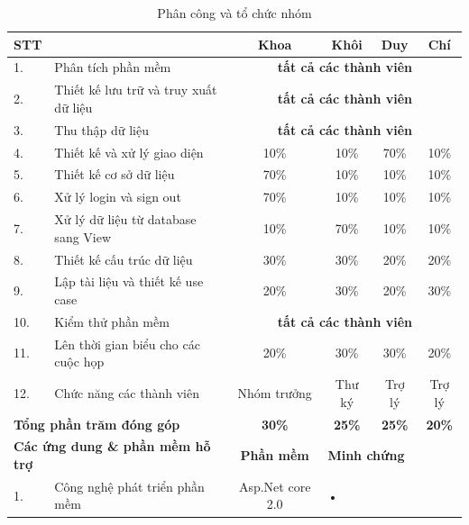\documentclass[a4paper]{article}
\begin{document}
	\begin{table}[h!]
	\centering
	\caption{Phân công và tổ chức nhóm}
	\label{tb:rubrics}
	\begin{tabularx}{475pt}{|l|X|c|c|c|c|}
		\hline\hline
		\textbf{STT} & \backslashbox{\textbf{Công việc}}{\textbf{Thành viên}} & \textbf{ Khoa} & \textbf{ Khôi} & \textbf{ Duy} & \textbf{ Chí}\\
		\hline
		1. & Phân tích phần mềm & \multicolumn{4}{|c|}{\textbf{tất cả các thành viên}}  \\ \hline
		2. & Thiết kế  lưu trữ và truy xuất dữ liệu   & \multicolumn{4}{|c|}{\textbf{tất cả các thành viên}} \\ \hline

		3. & Thu thập dữ liệu  & \multicolumn{4}{|c|}{\textbf{tất cả các thành viên}}  \\ \hline

		4. & Thiết kế và xử lý giao diện  & 10\% & 10\% & 70\% & 10\% \\ \hline

		5. & Thiết kế cơ sở dữ liệu & 70\% & 10\% & 10\% & 10\% \\ \hline
		6. & Xử lý login và sign out & 70\% & 10\% & 10\% & 10\% \\ \hline

		7. & Xử lý dữ liệu từ database sang View & 10\% & 70\% & 10\% & 10\% \\ \hline

		8. & Thiết kế cấu trúc dữ liệu & 30\% & 30\% & 20\% & 20\% \\ \hline

		9. & Lập tài liệu và thiết kế use case & 20\% & 30\% & 20\% & 30\% \\ \hline

		10. & Kiểm thử phần mềm & \multicolumn{4}{|c|}{\textbf{tất cả các thành viên}}  \\ \hline

		11. & Lên thời gian biểu cho các cuộc họp & 20\% & 30\% & 30\% & 20\% \\ \hline

		12. & Chức năng các thành viên & Nhóm trưởng & Thư ký & Trợ lý & Trợ lý \\ \hline


		\multicolumn{2}{|l|}{\textbf{Tổng phần trăm đóng góp}} &\textbf{30\%}& \textbf{25\%}& \textbf{25\%} & \textbf{20\%} \\ \hline

		\multicolumn{2}{|l|}{\textbf{Các ứng dung \& phần mềm hỗ trợ}} & \textbf{Phần mềm} & \multicolumn{3}{l|}{\textbf{Minh chứng}} \\ \hline
		1. & Công nghệ phát triển phần mềm & Asp.Net core 2.0 	& \multicolumn{3}{l|}{•} \\ \hline


\end{tabularx}
\end{table}
\end{document}
